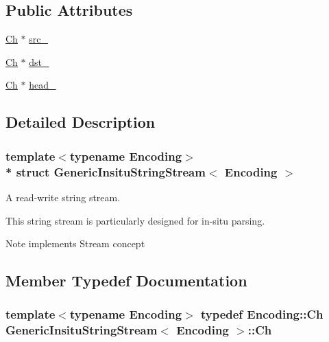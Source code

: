 \subsection*{Public Attributes}
\begin{DoxyCompactItemize}
\item 
\hyperlink{structGenericInsituStringStream_a277308a58f551f11d0d9a20823702b5a}{Ch} $\ast$ \hyperlink{structGenericInsituStringStream_af3cc551dd07fcca39db84459f4d4e718}{src\+\_\+}
\item 
\hyperlink{structGenericInsituStringStream_a277308a58f551f11d0d9a20823702b5a}{Ch} $\ast$ \hyperlink{structGenericInsituStringStream_ab0e7a73638a7a8db81aa9b26714b0e3b}{dst\+\_\+}
\item 
\hyperlink{structGenericInsituStringStream_a277308a58f551f11d0d9a20823702b5a}{Ch} $\ast$ \hyperlink{structGenericInsituStringStream_af5a7116bdd9bfde5141c298a5b7566b0}{head\+\_\+}
\end{DoxyCompactItemize}


\subsection{Detailed Description}
\subsubsection*{template$<$typename Encoding$>$\\*
struct Generic\+Insitu\+String\+Stream$<$ Encoding $>$}

A read-\/write string stream. 

This string stream is particularly designed for in-\/situ parsing. \begin{DoxyNote}{Note}
implements Stream concept 
\end{DoxyNote}


\subsection{Member Typedef Documentation}
\subsubsection[{\texorpdfstring{Ch}{Ch}}]{\setlength{\rightskip}{0pt plus 5cm}template$<$typename Encoding$>$ typedef Encoding\+::\+Ch {\bf Generic\+Insitu\+String\+Stream}$<$ Encoding $>$\+::{\bf Ch}}\hypertarget{structGenericInsituStringStream_a277308a58f551f11d0d9a20823702b5a}{}\label{structGenericInsituStringStream_a277308a58f551f11d0d9a20823702b5a}



